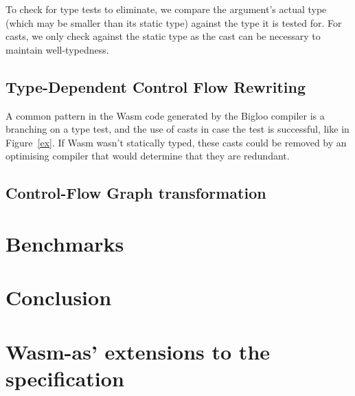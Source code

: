\documentclass[a4paper,11pt]{article}
\begin{document}
To check for type tests to eliminate, we compare the argument's actual type
(which may be smaller than its static type) against the type it is tested for.
For casts, we only check against the static type as the cast can be necessary to
maintain well-typedness.

\subsection{Type-Dependent Control Flow Rewriting}\label{broncast}
A common pattern in the Wasm code generated by the Bigloo compiler is a
branching on a type test, and the use of casts in case the test is successful,
like in Figure~\ref{ex}. If Wasm wasn't statically typed, these casts could be
removed by an optimising compiler that would determine that they are redundant.

\subsection{Control-Flow Graph transformation}
\section{Benchmarks}\label{bench}
\section{Conclusion}
\printbibliography
\newpage
\appendix
\section{Wasm-as' extensions to the specification}\label{wasmasex}
\end{document}
